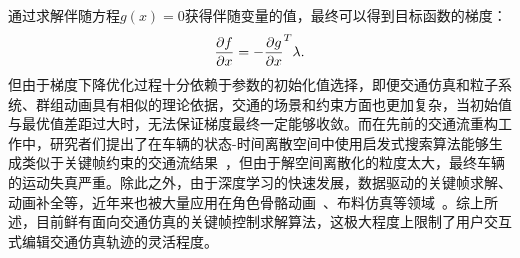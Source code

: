 通过求解伴随方程$g(x) = 0$获得伴随变量的值，最终可以得到目标函数的梯度：
\begin{equation}
\setlength\abovedisplayskip{10pt}
\setlength\belowdisplayskip{10pt}
    \frac{\partial f}{\partial x} = - \frac{\partial g}{\partial x}^T \lambda.
\label{eq:intro_adjoint4}
\end{equation}
但由于梯度下降优化过程十分依赖于参数的初始化值选择，即便交通仿真和粒子系统、群组动画具有相似的理论依据，交通的场景和约束方面也更加复杂，当初始值与最优值差距过大时，无法保证梯度最终一定能够收敛。而在先前的交通流重构工作中，研究者们提出了在车辆的状态-时间离散空间中使用启发式搜索算法能够生成类似于关键帧约束的交通流结果~\cite{van2007kinodynamic, sewall2010virtualized}，但由于解空间离散化的粒度太大，最终车辆的运动失真严重。除此之外，由于深度学习的快速发展，数据驱动的关键帧求解、动画补全等，近年来也被大量应用在角色骨骼动画~\cite{xu2018weighted, harvey2020robust, tang2022real}、布料仿真等领域~\cite{wang2019learning}。综上所述，目前鲜有面向交通仿真的关键帧控制求解算法，这极大程度上限制了用户交互式编辑交通仿真轨迹的灵活程度。




